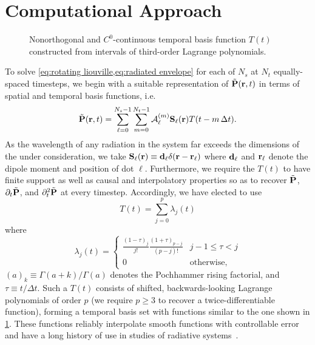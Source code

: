 \section{\label{section:computational approach}Computational Approach}

\begin{figure}
  
  \caption{\label{fig:interpolation basis} Nonorthogonal and $C^0$-continuous temporal basis function $T(t)$ constructed from intervals of third-order Lagrange polynomials.}
\end{figure}
To solve \cref{eq:rotating liouville,eq:radiated envelope} for each of $N_s$ \qds{} at $N_t$ equally-spaced timesteps, we begin with a suitable representation of $\tilde{\vb{P}}(\vb{r}, t)$ in terms of spatial and temporal basis functions, i.e.~
\begin{equation}
  \tilde{\vb{P}}(\vb{r}, t) = \sum_{\ell=0}^{N_s - 1} \sum_{m = 0}^{N_t - 1} \mathcal{A}_{\ell}^{(m)} \vb{S}_\ell(\vb{r}) T(t - m \, \Delta t).
  \label{eq:basis function representation}
\end{equation}
As the wavelength of any radiation in the system far exceeds the dimensions of the \qds{} under consideration, we take $\vb{S}_\ell(\vb{r}) \equiv \vb{d}_\ell \delta(\vb{r} - \vb{r}_\ell)$ where $\vb{d}_\ell$ and $\vb{r}_\ell$ denote the dipole moment and position of dot $\ell$.
Furthermore, we require the $T(t)$ to have finite support as well as causal and interpolatory properties so as to recover $\tilde{\vb{P}}$, $\partial_t \tilde{\vb{P}}$, and $\partial^2_t \tilde{\vb{P}}$ at every timestep.
Accordingly, we have elected to use
\begin{equation}
  T(t) = \sum_{j = 0}^p \lambda_j(t)
  \label{eq:basis sum}
\end{equation}
where
\begin{equation}
  \lambda_j(t) =
  \begin{cases}
    \frac{(1 - \tau)_j}{j!} \frac{(1 + \tau)_{p-j}}{(p-j)!} & j-1 \le \tau < j \\
    0 & \text{otherwise,}
  \end{cases}
  \label{eq:basis piece}
\end{equation}
$(a)_k \equiv \Gamma(a + k)/\Gamma(a)$ denotes the Pochhammer rising factorial, and $\tau \equiv t/\Delta t$.
Such a $T(t)$ consists of shifted, backwards-looking Lagrange polynomials of order $p$ (we require $p \ge 3$ to recover a twice-differentiable function), forming a temporal basis set with functions similar to the one shown in \cref{fig:interpolation basis}.
These functions  reliably interpolate smooth functions with controllable error and have a long history of use in studies of radiative systems~\cite{Manara1997,Bluck1997}.

